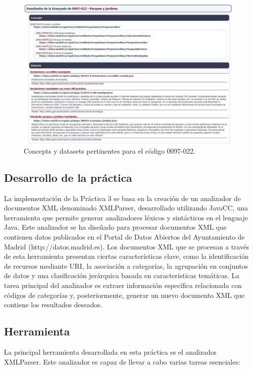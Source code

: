 \begin{figure}[H]
\centering
\includegraphics[width=\textwidth]{imagenes/Practica3fig2.jpg}
\caption{\label{fig:Practica3fig2.jpg}Concepts y datasets pertinentes para el código 0097-022.}
\end{figure}

\subsection{Desarrollo de la práctica}

La implementación de la Práctica 3 se basa en la creación de un analizador de documentos XML denominado XMLParser, desarrollado utilizando JavaCC, una herramienta que permite generar analizadores léxicos y sintácticos en el lenguaje Java. Este analizador se ha diseñado para procesar documentos XML que contienen datos publicados en el Portal de Datos Abiertos del Ayuntamiento de Madrid (http://datos.madrid.es).
Los documentos XML que se procesan a través de esta herramienta presentan ciertas características clave, como la identificación de recursos mediante URI, la asociación a categorías, la agrupación en conjuntos de datos y una clasificación jerárquica basada en características temáticas. La tarea principal del analizador es extraer información específica relacionada con códigos de categorías y, posteriormente, generar un nuevo documento XML que contiene los resultados deseados.

\subsection{Herramienta}
La principal herramienta desarrollada en esta práctica es el analizador XMLParser. Este analizador es capaz de llevar a cabo varias tareas esenciales:

